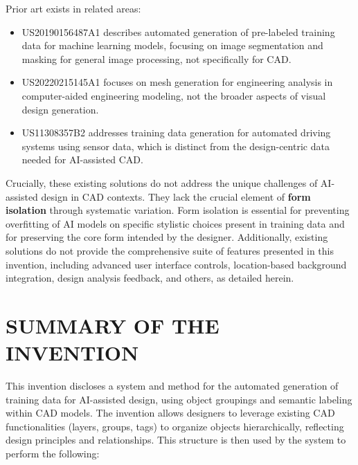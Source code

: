 \documentclass[12pt]{report}
\begin{document}
Prior art exists in related areas:
\begin{itemize}
    \item US20190156487A1 describes automated generation of pre-labeled training data for machine learning models, focusing on image segmentation and masking for general image processing, not specifically for CAD.
    \item US20220215145A1 focuses on mesh generation for engineering analysis in computer-aided engineering modeling, not the broader aspects of visual design generation. 
    \item US11308357B2 addresses training data generation for automated driving systems using sensor data, which is distinct from the design-centric data needed for AI-assisted CAD.
\end{itemize}


Crucially, these existing solutions do not address the unique challenges of AI-assisted design in CAD contexts.  They lack the crucial element of \textbf{form isolation} through systematic variation.  Form isolation is essential for preventing overfitting of AI models on specific stylistic choices present in training data and for preserving the core form intended by the designer. Additionally, existing solutions do not provide the comprehensive suite of features presented in this invention, including advanced user interface controls, location-based background integration, design analysis feedback, and others, as detailed herein.

\section{SUMMARY OF THE INVENTION}
This invention discloses a system and method for the automated generation of training data for AI-assisted design, using object groupings and semantic labeling within CAD models.  The invention allows designers to leverage existing CAD functionalities (layers, groups, tags) to organize objects hierarchically, reflecting design principles and relationships.  This structure is then used by the system to perform the following:
\end{document}
